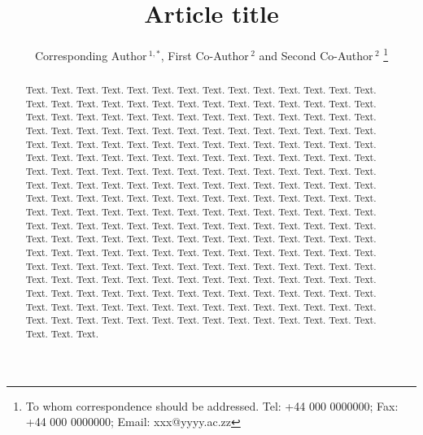 \documentclass[a4,center,fleqn]{NAR}
\begin{document}
\title{Article title}

\author{%
Corresponding Author\,$^{1,*}$,
First Co-Author\,$^{2}$
and Second Co-Author\,$^2$%
\footnote{To whom correspondence should be addressed.
Tel: +44 000 0000000; Fax: +44 000 0000000; Email: xxx@yyyy.ac.zz}}

\address{%
$^{1}$Affiliation of Corresponding Author
and
$^{2}$Affiliation of Both Co-Authors}


\maketitle

\begin{abstract}
Text. Text. Text. Text. Text. Text. Text. Text. Text. Text. Text.
Text. Text. Text. Text. Text. Text. Text. Text. Text. Text. Text.
Text. Text. Text. Text. Text. Text. Text. Text. Text. Text. Text.
Text. Text. Text. Text. Text. Text. Text. Text. Text. Text. Text.
Text. Text. Text. Text. Text. Text. Text. Text. Text. Text. Text.
Text. Text. Text. Text. Text. Text. Text. Text. Text. Text. Text.
Text. Text. Text. Text. Text. Text. Text. Text. Text. Text. Text.
Text. Text. Text. Text. Text. Text. Text. Text. Text. Text. Text.
Text. Text. Text. Text. Text. Text. Text. Text. Text. Text. Text.
Text. Text. Text. Text. Text. Text. Text. Text. Text. Text. Text.
Text. Text. Text. Text. Text. Text. Text. Text. Text. Text. Text.
Text. Text. Text. Text. Text. Text. Text. Text. Text. Text. Text.
Text. Text. Text. Text. Text. Text. Text. Text. Text. Text. Text.
Text. Text. Text. Text. Text. Text. Text. Text. Text. Text. Text.
Text. Text. Text. Text. Text. Text. Text. Text. Text. Text. Text.
Text. Text. Text. Text. Text. Text. Text. Text. Text. Text. Text.
Text. Text. Text. Text. Text. Text. Text. Text. Text. Text. Text.
Text. Text. Text. Text. Text. Text. Text. Text. Text. Text. Text.
Text. Text. Text. Text. Text. Text. Text. Text. Text. Text. Text.
Text. Text. Text. Text. Text. Text. Text. Text. Text. Text. Text.
Text. Text. Text. Text. Text. Text. Text. Text. Text. Text. Text.
Text. Text. Text. Text. Text. Text. Text. Text. Text. Text. Text.
Text. Text. Text. Text. Text. Text. Text. Text. Text. Text. Text.
Text. Text.
\end{abstract}
\end{document}
